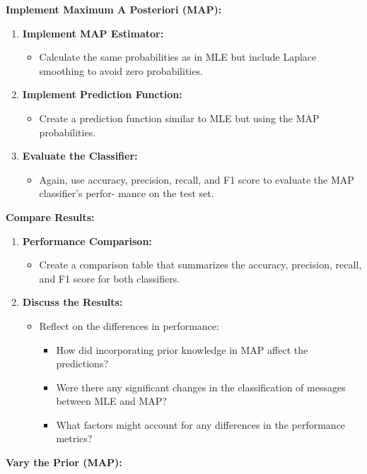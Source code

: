 \documentclass[a3paper,12pt]{extarticle} %
\begin{document}
\textbf{Implement Maximum A Posteriori (MAP):}
\begin{enumerate}
    \item \textbf{Implement MAP Estimator:}
    \begin{itemize}
        \item Calculate the same probabilities as in MLE but include Laplace smoothing to avoid zero probabilities.
    \end{itemize}
    \item \textbf{Implement Prediction Function:}
    \begin{itemize}
        \item Create a prediction function similar to MLE but using the MAP probabilities.
    \end{itemize}
    \item \textbf{Evaluate the Classifier:}
    \begin{itemize}
        \item Again, use accuracy, precision, recall, and F1 score to evaluate the MAP classifier’s perfor-
        mance on the test set.
    \end{itemize}
\end{enumerate}
\textbf{Compare Results:}
\begin{enumerate}
    \item \textbf{Performance Comparison:}
    \begin{itemize}
        \item Create a comparison table that summarizes the accuracy, precision, recall, and F1 score for both classifiers.
    \end{itemize}
    \item \textbf{Discuss the Results:}
    \begin{itemize}
        \item Reflect on the differences in performance:
        \begin{itemize}
            \item How did incorporating prior knowledge in MAP affect the predictions?
            \item Were there any significant changes in the classification of messages between MLE and MAP?
            \item What factors might account for any differences in the performance metrics?
        \end{itemize}
    \end{itemize}
\end{enumerate}
\textbf{Vary the Prior (MAP):}
\end{document}
